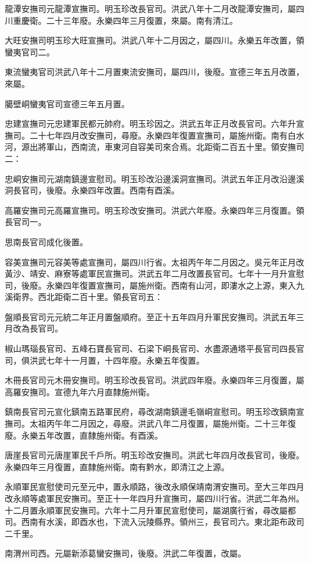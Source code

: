 龍潭安撫司元龍潭宣撫司。明玉珍改長官司。洪武八年十二月改龍潭安撫司，屬四川重慶衛。二十三年廢。永樂四年三月復置，來屬。南有清江。

大旺安撫司明玉珍大旺宣撫司。洪武八年十二月因之，屬四川。永樂五年改置，領蠻夷官司二。

東流蠻夷官司洪武八年十二月置東流安撫司，屬四川，後廢。宣德三年五月改置，來屬。

臈壁峒蠻夷官司宣德三年五月置。

忠建宣撫司元忠建軍民都元帥府。明玉珍因之。洪武五年正月改長官司。六年升宣撫司。二十七年四月改安撫司，尋廢。永樂四年復置宣撫司，屬施州衛。南有白水河，源出將軍山，西南流，車東河自容美司來合焉。北距衛二百五十里。領安撫司二：

忠峒安撫司元湖南鎮邊宣慰司。明玉珍改沿邊溪洞宣撫司。洪武五年正月改沿邊溪洞長官司，後廢。永樂四年改置。西南有酉溪。

高羅安撫司元高羅宣撫司。明玉珍改安撫司。洪武六年廢。永樂四年三月復置。領長官司一。

思南長官司成化後置。

容美宣撫司元容美等處宣撫司，屬四川行省。太祖丙午年二月因之。吳元年正月改黃沙、靖安、麻寮等處軍民宣撫司。洪武五年二月改置長官司。七年十一月升宣慰司，後廢。永樂四年復置宣撫司，屬施州衛。西南有山河，即漊水之上源，東入九溪衛界。西北距衛二百十里。領長官司五：

盤順長官司元元統二年正月置盤順府。至正十五年四月升軍民安撫司。洪武五年三月改為長官司。

椒山瑪瑙長官司、五峰石寶長官司、石梁下峒長官司、水盡源通塔平長官司四長官司，俱洪武七年十一月置，十四年廢。永樂五年復置。

木冊長官司元木冊安撫司。明玉珍改長官司。洪武四年廢。永樂四年三月復置，屬高羅安撫司。宣德九年六月直隸施州衛。

鎮南長官司元宣化鎮南五路軍民府，尋改湖南鎮邊毛嶺峒宣慰司。明玉珍改鎮南宣撫司。太祖丙午年二月因之，尋廢。洪武八年二月復置，屬施州衛。二十三年復廢。永樂五年改置，直隸施州衛。有酉溪。

唐崖長官司元唐崖軍民千戶所。明玉珍改安撫司。洪武七年四月改長官司，後廢。永樂四年三月復置，直隸施州衛。南有黔水，即清江之上源。

永順軍民宣慰使司元至元中，置永順路，後改永順保靖南渭安撫司。至大三年四月改永順等處軍民安撫司。至正十一年四月升宣撫司，屬四川行省。洪武二年為州。十二月置永順軍民安撫司。六年十二月升軍民宣慰使司，屬湖廣行省，尋改屬都司。西南有水溪，即酉水也，下流入沅陵縣界。領州三，長官司六。東北距布政司二千里。

南渭州司西。元屬新添葛蠻安撫司，後廢。洪武二年復置，改屬。

